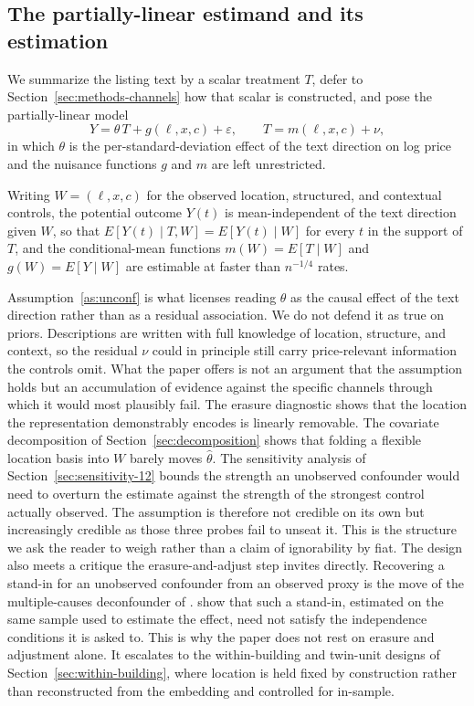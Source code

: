 \subsection{The partially-linear estimand and its estimation}

We summarize the listing text by a scalar treatment $T$, defer to
Section~\ref{sec:methods-channels} how that scalar is constructed, and pose the
partially-linear model
\begin{equation}
Y = \theta\,T + g(\ell, x, c) + \varepsilon, \qquad
T = m(\ell, x, c) + \nu,
\label{eq:plr}
\end{equation}
in which $\theta$ is the per-standard-deviation effect of the text direction on
log price and the nuisance functions $g$ and $m$ are left unrestricted.

\begin{assumption}
\label{as:unconf}
Writing $W = (\ell, x, c)$ for the observed location, structured, and contextual
controls, the potential outcome $Y(t)$ is mean-independent of the text direction
given $W$, so that $E[Y(t) \mid T, W] = E[Y(t) \mid W]$ for every $t$ in the
support of $T$, and the conditional-mean functions $m(W) = E[T \mid W]$ and
$g(W) = E[Y \mid W]$ are estimable at faster than $n^{-1/4}$ rates.
\end{assumption}

Assumption~\ref{as:unconf} is what licenses reading $\theta$ as the causal effect
of the text direction rather than as a residual association. We do not defend
it as true on priors. Descriptions are written with full knowledge of location,
structure, and context, so the residual $\nu$ could in principle still carry
price-relevant information the controls omit. What the paper offers is not an
argument that the assumption holds but an accumulation of evidence against the
specific channels through which it would most plausibly fail. The erasure
diagnostic shows that the location the representation demonstrably encodes is
linearly removable. The covariate decomposition of Section~\ref{sec:decomposition}
shows that folding a flexible location basis into $W$ barely moves $\hat\theta$.
The sensitivity analysis of Section~\ref{sec:sensitivity-12} bounds the
strength an unobserved confounder would need to overturn the estimate against the
strength of the strongest control actually observed. The assumption is therefore
not credible on its own but increasingly credible as those three probes fail to
unseat it. This is the structure we ask the reader to weigh rather than a claim
of ignorability by fiat. The design also meets a critique the erasure-and-adjust
step invites directly. Recovering a stand-in for an unobserved confounder from an
observed proxy is the move of the multiple-causes deconfounder of
\citet{wangblei2019}. \citet{ogburn2019comment} show that such a stand-in,
estimated on the same sample used to estimate the effect, need not satisfy the
independence conditions it is asked to. This is why the paper does not rest on
erasure and adjustment alone. It escalates to the within-building and twin-unit
designs of Section~\ref{sec:within-building}, where location is held fixed by
construction rather than reconstructed from the embedding and controlled for
in-sample.

